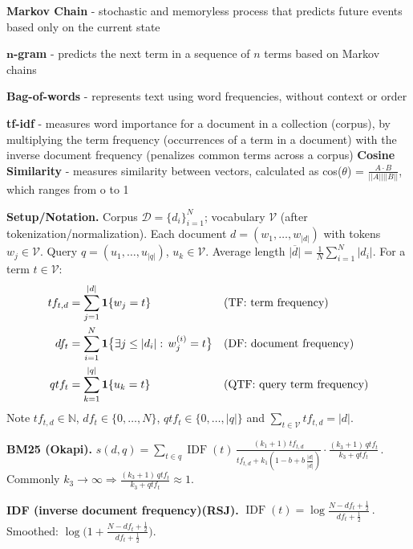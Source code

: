 \documentclass[10pt,landscape]{article}
\begin{document}
\begin{multicols}{3}
    \textbf{Markov Chain} - stochastic and memoryless process that predicts future events based only on the current state

    $\boldsymbol{n}$\textbf{-gram} - predicts the next term in a sequence of $n$ terms based on Markov chains

    \textbf{Bag-of-words} - represents text using word frequencies, without context or order

    \textbf{tf-idf} - measures word importance for a document in a collection (corpus), by multiplying the term frequency (occurrences of a term in a document) with the inverse document frequency (penalizes common terms across a corpus)
    \textbf{Cosine Similarity} - measures similarity between vectors, calculated as cos($\theta$) =
    $\frac{A\cdot B}{||A||||B||} $, which ranges from o to 1

    \textbf{Setup/Notation.}
    Corpus $\mathcal{D}=\{d_i\}_{i=1}^N$; vocabulary $\mathcal{V}$ (after tokenization/normalization).
    Each document $d=(w_1,\dots,w_{|d|})$ with tokens $w_j\in\mathcal{V}$.
    Query $q=(u_1,\dots,u_{|q|})$, $u_k\in\mathcal{V}$.
    Average length $\displaystyle \overline{|d|}=\frac{1}{N}\sum_{i=1}^N |d_i|$.
    For a term $t\in\mathcal{V}$:
    \[
        \begin{aligned}
            tf_{t,d} & = \sum_{j=1}^{|d|}\mathbf{1}\{w_j=t\}                                  &  & \text{(TF: term frequency)}        \\
            df_t     & = \sum_{i=1}^N \mathbf{1}\big\{\exists j\le |d_i|:\, w^{(i)}_j=t\big\} &  & \text{(DF: document frequency)}    \\
            qtf_t    & = \sum_{k=1}^{|q|}\mathbf{1}\{u_k=t\}                                  &  & \text{(QTF: query term frequency)}
        \end{aligned}
    \]
    Note $tf_{t,d}\in\mathbb{N}$, $df_t\in\{0,\dots,N\}$, $qtf_t\in\{0,\dots,|q|\}$ and $\sum_{t\in\mathcal{V}} tf_{t,d}=|d|$.

    \textbf{BM25 (Okapi).}
    $\displaystyle s(d,q)=\sum_{t\in q} \operatorname{IDF}(t)\,
        \frac{(k_1+1)\,tf_{t,d}}{tf_{t,d}+k_1\!\left(1-b+b\,\tfrac{|d|}{\overline{|d|}}\right)}
        \cdot\frac{(k_3+1)\,qtf_t}{k_3+qtf_t}\,.$
    \; Commonly $k_3\!\to\!\infty\Rightarrow\frac{(k_3+1)\,qtf_t}{k_3+qtf_t}\!\approx\!1$.

    \textbf{IDF (inverse document frequency)(RSJ).}
    $\displaystyle \operatorname{IDF}(t)=\log\frac{N-df_t+\tfrac12}{df_t+\tfrac12}\,.$
    \; Smoothed: $\displaystyle \log\!\Big(1+\frac{N-df_t+\tfrac12}{df_t+\tfrac12}\Big)$.


\end{multicols}
\end{document}
